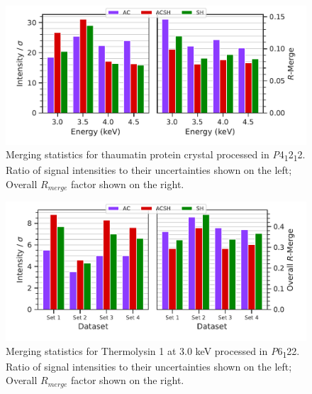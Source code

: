 \begin{figure}[h]
    \centering
    \includegraphics{plots/exp0/thaum_stats_grid.pdf}
    \caption{Merging statistics for thaumatin protein crystal processed in \textit{P}4\textsubscript{1}2\textsubscript{1}2. Ratio of signal intensities to their uncertainties shown on the left; Overall $R_{merge}$ factor shown on the right.}
    \label{fig:thaum1_stats}
\end{figure}


\newpage

\begin{figure}
    \centering
    \includegraphics{plots/exp1/tlys_9_P6122/3p0_stats_grid.pdf}
    \caption{Merging statistics for Thermolysin 1 at 3.0 \unit{keV} processed in \textit{P}6\textsubscript{1}22. Ratio of signal intensities to their uncertainties shown on the left; Overall $R_{merge}$ factor shown on the right.}
    \label{fig:tlys_9_3p0}
\end{figure}

